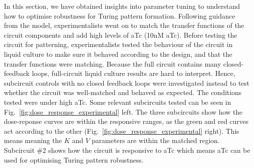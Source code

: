 In this section, we have obtained insights into parameter tuning
to understand how to optimise robustness for Turing pattern formation.
Following guidance from the model,
experimentalists went on to match the transfer functions of the circuit components and add high levels of aTc (10nM aTc).
Before testing the circuit for patterning,
experimentalists tested the behaviour of the circuit in liquid culture to make sure it behaved according to the design,
and that the transfer functions were matching.
Because the full circuit contains many closed-feedback loops, full-circuit liquid culture results are hard to interpret.
Hence,
subcircuit controls with no closed feedback loops were investigated
instead to test whether the circuit was well-matched and behaved as expected.
The conditions tested were under high aTc.
Some relevant subcircuits tested can be seen in Fig.~\ref{fig:dose_response_experimental} left.
The three subcircuits show how the dose-reponse curves are within the responsive ranges, as the green and red curves act according to the other (Fig.~\ref{fig:dose_response_experimental} right).
This means meaning the $K$ and $V$ parameters are within the matched region.
Subcircuit \#2 shows how the circuit is responsive to aTc which means aTc can be used for optimising Turing pattern robustness.

